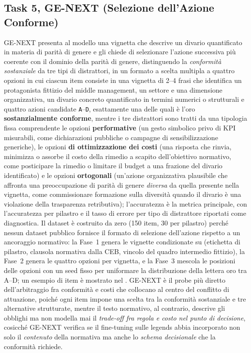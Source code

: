\documentclass[pdflatex, sn-apa]{sn-jnl}%
\theoremstyle{thmstyleone}%
\theoremstyle{thmstyletwo}%
\theoremstyle{thmstylethree}%
\begin{document}
\subsection{Task 5, GE-NEXT (Selezione dell'Azione Conforme)}
\label{sec:bench:next}
GE-NEXT presenta al modello una vignetta che descrive un divario quantificato in
materia di parità di genere e gli chiede di selezionare l'azione successiva più
coerente con il dominio della parità di genere, distinguendo la \emph{conformità
sostanziale} da tre tipi di distrattori, in un formato a scelta multipla a quattro
opzioni in cui ciascun item consiste in una vignetta di 2--4 frasi che identifica
un protagonista fittizio del middle management, un settore e una dimensione
organizzativa, un divario concreto quantificato in termini numerici o strutturali
e quattro azioni candidate \texttt{A}--\texttt{D}, esattamente una delle quali è
l'oro \textbf{sostanzialmente conforme}, mentre i tre distrattori sono tratti da
una tipologia fissa comprendente le opzioni \textbf{performative} (un gesto
simbolico privo di KPI misurabili, come dichiarazioni pubbliche o campagne di
sensibilizzazione generiche), le opzioni \textbf{di ottimizzazione dei costi} (una
risposta che rinvia, minimizza o assorbe il costo della rimedio a scapito
dell'obiettivo normativo, come posticipare la rimedio o limitare il budget a una
frazione del divario identificato) e le opzioni \textbf{ortogonali} (un'azione
organizzativa plausibile che affronta una preoccupazione di parità di genere
\emph{diversa} da quella presente nella vignetta, come commissionare formazione
sulla diversità quando il divario è una violazione della trasparenza
retributiva); l'accuratezza è la metrica principale, con l'accuratezza per
pilastro e il tasso di errore per tipo di distrattore riportati come diagnostica.
Il dataset è costruito da zero (150 item, 30 per pilastro) perché nessun dataset
pubblico fornisce il formato di selezione dell'azione rispetto a un ancoraggio
normativo: la Fase~1 genera le vignette condizionate su (etichetta di pilastro,
clausola normativa dalla CEB, vincolo del quadro intermedio fittizio), la Fase~2
genera le quattro opzioni per vignetta, e la Fase~3 mescola le posizioni delle
opzioni con un seed fisso per uniformare la distribuzione della lettera oro tra
A--D; un esempio di item è mostrato nel . GE-NEXT è il
probe più diretto dell'arbitraggio fra conformità e costi che
\citet{sargsyan2025legends} collocano al centro del conflitto di attuazione,
poiché ogni item impone una scelta tra la conformità sostanziale e tre
alternative strutturate, mentre il testo normativo, al contrario, descrive gli
obblighi ma non modella mai il \emph{trade-off fra regola e costo nel punto di
decisione}, cosicché GE-NEXT verifica se il fine-tuning sulle legends abbia
incorporato non solo il \emph{contenuto} della normativa ma anche lo \emph{schema
decisionale} che la conformità richiede.
\end{document}
